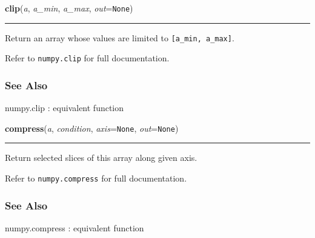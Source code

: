     \begin{boxedminipage}{\textwidth}

    \raggedright \textbf{clip}(\textit{a}, \textit{a\_min}, \textit{a\_max}, \textit{out}=\texttt{None})

    \vspace{-1.5ex}

    \rule{\textwidth}{0.5\fboxrule}

Return an array whose values are limited to \texttt{{[}a{\_}min, a{\_}max{]}}.

Refer to \texttt{numpy.clip} for full documentation.



\hypertarget{see-also}{}
\subsubsection*{See Also}

numpy.clip : equivalent function
    \vspace{1ex}

    \end{boxedminipage}

    \label{numpy:ndarray:compress}

    \vspace{0.5ex}

    \begin{boxedminipage}{\textwidth}

    \raggedright \textbf{compress}(\textit{a}, \textit{condition}, \textit{axis}=\texttt{None}, \textit{out}=\texttt{None})

    \vspace{-1.5ex}

    \rule{\textwidth}{0.5\fboxrule}

Return selected slices of this array along given axis.

Refer to \texttt{numpy.compress} for full documentation.



\hypertarget{see-also}{}
\subsubsection*{See Also}

numpy.compress : equivalent function
    \vspace{1ex}

    \end{boxedminipage}

